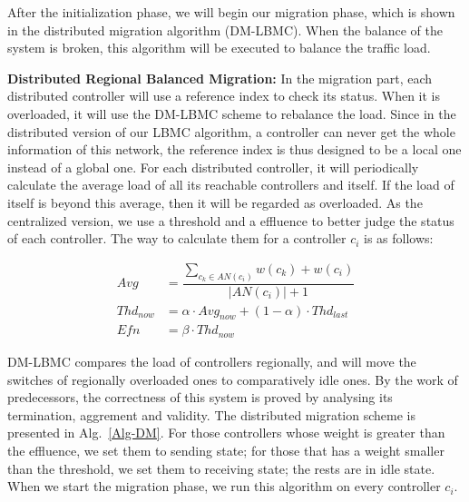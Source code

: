 After the initialization phase, we will begin our migration phase, which is shown in the distributed migration algorithm (DM-LBMC). When the balance of the system is broken, this algorithm will be executed to balance the traffic load.


\textbf{Distributed Regional Balanced Migration:}
In the migration part, each distributed controller will use a reference index to check its status. When it is overloaded, it will use the DM-LBMC scheme to rebalance the load. Since in the distributed version of our LBMC algorithm, a controller can never get the whole information of this network, the reference index is thus designed to be a local one instead of a global one. For each distributed controller, it will periodically calculate the average load of all its reachable controllers and itself. If the load of itself is beyond this average, then it will be regarded as overloaded. As the centralized version, we use a threshold and a effluence to better judge the status of each controller. The way to calculate them for a controller $c_i$ is as follows:

\begin{align*}
Avg&=\dfrac{\sum_{c_k\in AN(c_i)}w(c_k) + w(c_i)}{|AN(c_i)|+1}\\
Thd_{now}&=\alpha \cdot Avg_{now}+ (1-\alpha) \cdot Thd_{last}\\
Efn&=\beta \cdot Thd_{now}
\end{align*}

DM-LBMC compares the load of controllers regionally, and will move the switches of regionally overloaded ones to comparatively idle ones. By the work of predecessors, the correctness of this system is proved by analysing its termination, aggrement and validity. The distributed migration scheme is presented in Alg.~\ref{Alg-DM}. For those controllers whose weight is greater than the effluence, we set them to sending state; for those that has a weight smaller than the threshold, we set them to receiving state; the rests are in idle state. When we start the migration phase, we run this algorithm on every controller $c_i$.

